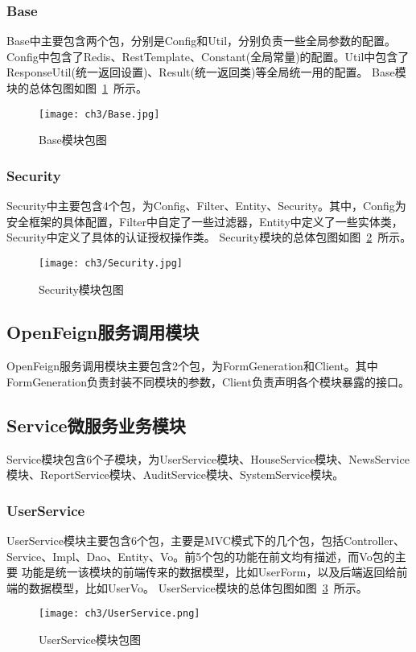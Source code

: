 \subsubsection{Base}
Base中主要包含两个包，分别是Config和Util，分别负责一些全局参数的配置。Config中包含了Redis、RestTemplate、Constant(全局常量)的配置。Util中包含了ResponseUtil(统一返回设置)、Result(统一返回类)等全局统一用的配置。
Base模块的总体包图如图~\ref{fig:Base}~所示。
\begin{figure}[htbp]
    \centering
    \texttt{[image: ch3/Base.jpg]}
    \caption{Base模块包图}\label{fig:Base}
    \vspace{\baselineskip} %
\end{figure}

\subsubsection{Security}
Security中主要包含4个包，为Config、Filter、Entity、Security。其中，Config为安全框架的具体配置，Filter中自定了一些过滤器，Entity中定义了一些实体类，Security中定义了具体的认证授权操作类。
Security模块的总体包图如图~\ref{fig:Security}~所示。
\begin{figure}[htbp]
    \centering
    \texttt{[image: ch3/Security.jpg]}
    \caption{Security模块包图}\label{fig:Security}
    \vspace{\baselineskip} %
\end{figure}

\subsection{OpenFeign服务调用模块}
OpenFeign服务调用模块主要包含2个包，为FormGeneration和Client。其中FormGeneration负责封装不同模块的参数，Client负责声明各个模块暴露的接口。

\subsection{Service微服务业务模块}
Service模块包含6个子模块，为UserService模块、HouseService模块、NewsService模块、ReportService模块、AuditService模块、SystemService模块。

\subsubsection{UserService}
UserService模块主要包含6个包，主要是MVC模式下的几个包，包括Controller、Service、Impl、Dao、Entity、Vo。前5个包的功能在前文均有描述，而Vo包的主要
功能是统一该模块的前端传来的数据模型，比如UserForm，以及后端返回给前端的数据模型，比如UserVo。
UserService模块的总体包图如图~\ref{fig:UserService}~所示。
\begin{figure}[htbp]
    \centering
    \texttt{[image: ch3/UserService.png]}
    \caption{UserService模块包图}\label{fig:UserService}
    \vspace{\baselineskip} %
\end{figure}


